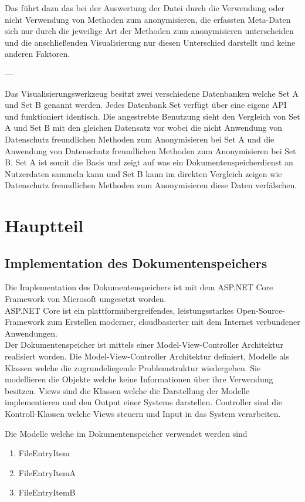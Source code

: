 \documentclass[
    fontsize=12pt,
    headings=small,
    parskip=half,           %
    bibliography=totoc,
    numbers=noenddot,       %
    open=any,               %
    ]{scrreprt}
\begin{document}
Das führt dazu das bei der Auswertung der Datei durch die Verwendung oder nicht Verwendung von Methoden zum anonymisieren, die erfassten Meta-Daten sich nur durch die jeweilige Art der Methoden zum anonymisieren unterscheiden und die anschließenden Visualisierung nur diesen Unterschied darstellt und keine anderen Faktoren. 

---

Das Visualisierungswerkzeug besitzt zwei verschiedene Datenbanken welche Set A und Set B genannt werden. 
Jedes Datenbank Set verfügt über eine eigene API und funktioniert identisch. Die angestrebte Benutzung sieht den Vergleich von Set A und Set B mit den gleichen Datensatz vor wobei die nicht Anwendung von Datenschutz freundlichen Methoden zum Anonymisieren bei Set A und die Anwendung von Datenschutz freundlichen Methoden zum Anonymisieren bei Set B. Set A ist somit die Basis und zeigt auf was ein Dokumentenspeicherdienst an Nutzerdaten sammeln kann und Set B kann im direkten Vergleich zeigen wie Datenschutz freundlichen Methoden zum Anonymisieren diese Daten verfälschen.

\chapter{Hauptteil}

\section{Implementation des Dokumentenspeichers}

Die Implementation des Dokumentenspeichers ist mit dem ASP.NET Core Framework von Microsoft umgesetzt worden. \\
\glqq ASP.NET Core ist ein plattformübergreifendes, leistungsstarkes Open-Source-Framework zum Erstellen moderner, cloudbasierter mit dem Internet verbundener Anwendungen.\grqq \\
Der Dokumentenspeicher ist mittels einer Model-View-Controller Architektur realisiert worden. Die Model-View-Controller Architektur definiert, Modelle als Klassen welche die zugrundeliegende Problemstruktur wiedergeben. Sie modellieren die Objekte welche keine Informationen über ihre Verwendung besitzen. 
Views sind die Klassen welche die Darstellung der Modelle implementieren und den Output einer Systems darstellen. Controller sind die Kontroll-Klassen welche Views steuern und Input in das System verarbeiten. 

Die Modelle welche im Dokumentenspeicher verwendet werden sind 
\begin{enumerate}
\item FileEntryItem
\item FileEntryItemA
\item FileEntryItemB
\end{enumerate}
\end{document}
